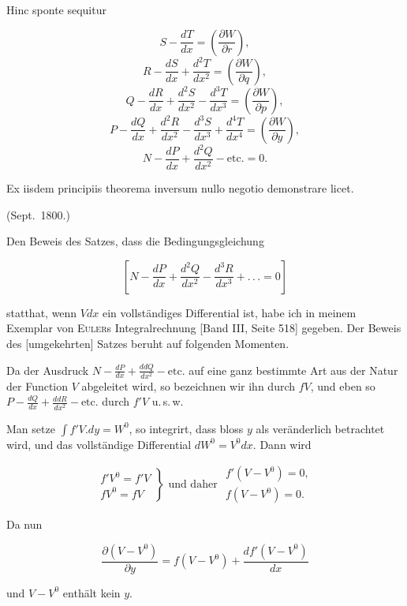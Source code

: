 Hinc sponte sequitur

\[
S - \frac{dT}{dx} = \left(\frac{\partial W}{\partial r}\right),
\]
\[
R - \frac{dS}{dx} + \frac{d^2T}{dx^2} = \left(\frac{\partial W}{\partial q}\right),
\]
\[
Q - \frac{dR}{dx} + \frac{d^2S}{dx^2} - \frac{d^3T}{dx^3} = \left(\frac{\partial W}{\partial p}\right),
\]
\[
P - \frac{dQ}{dx} + \frac{d^2R}{dx^2} - \frac{d^3S}{dx^3} + \frac{d^4T}{dx^4} = \left(\frac{\partial W}{\partial y}\right),
\]
\[
N - \frac{dP}{dx} + \frac{d^2Q}{dx^2} - \text{etc.} = 0.
\]

Ex iisdem principiis theorema inversum nullo negotio demonstrare licet.

\noindent (Sept.\ 1800.)

\par\smallskip\hrulefill\smallskip\par

\noindent\hspace*{\parindent}Den Beweis des Satzes, dass die Bedingungsgleichung

\[
\left[N - \frac{dP}{dx} + \frac{d^2Q}{dx^2} - \frac{d^3R}{dx^3} + .\,.\,. = 0\right]
\]

\noindent statthat, wenn $Vdx$ ein vollständiges Differential ist, habe ich in meinem Exemplar von \textsc{Euler}s Integralrechnung [Band III, Seite 518] gegeben. Der Beweis des [umgekehrten] Satzes beruht auf folgenden Momenten.

Da der Ausdruck $N - \frac{dP}{dx} + \frac{ddQ}{dx^2} - \text{etc.}$ auf eine ganz bestimmte Art aus der Natur der Function $V$ abgeleitet wird, so bezeichnen wir ihn durch $fV$, und eben so $P - \frac{dQ}{dx} + \frac{ddR}{dx^2} - \text{etc.}$ durch $f'V$ u.\,s.\,w.

Man setze $\int f'V  .  dy = W^0$, so integrirt, dass bloss $y$ als veränderlich betrachtet wird, und das vollständige Differential $dW^0 = V^0dx$. Dann wird

\[
\left.\begin{array}{l}
f'V^0 = f'V \\
fV^0 = fV
\end{array}\right\}
\text{ und daher }
\begin{array}{l}
f'(V - V^0) = 0, \\
f(V - V^0) = 0.
\end{array}
\]

\noindent Da nun

\[
\frac{\partial(V - V^0)}{\partial y} = f(V - V^0) + \frac{df'(V - V^0)}{dx}
\]

\noindent [gilt,. so ist auch $\dfrac{\partial(V - V^0)}{\partial y} = 0$] und $V - V^0$ enthält kein $y$.

